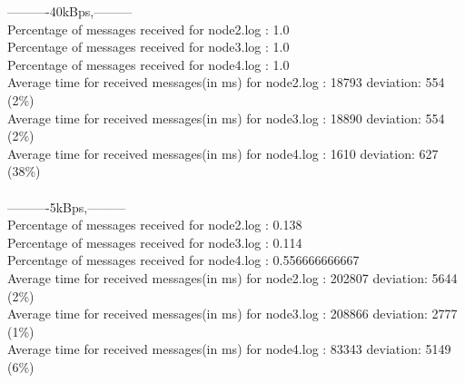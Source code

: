         ----------40kBps,---------\\
        Percentage of messages received for node2.log : 1.0\\
        Percentage of messages received for node3.log : 1.0\\
        Percentage of messages received for node4.log : 1.0\\
        Average time for received messages(in ms) for  node2.log : 18793    deviation: 554 (2\%)\\
        Average time for received messages(in ms) for  node3.log : 18890    deviation: 554 (2\%)\\
        Average time for received messages(in ms) for  node4.log : 1610     deviation: 627 (38\%)\\\\
        ----------5kBps,---------\\
        Percentage of messages received for node2.log : 0.138\\
        Percentage of messages received for node3.log : 0.114\\
        Percentage of messages received for node4.log : 0.556666666667\\
        Average time for received messages(in ms) for  node2.log : 202807   deviation: 5644 (2\%)\\
        Average time for received messages(in ms) for  node3.log : 208866   deviation: 2777 (1\%)\\
        Average time for received messages(in ms) for  node4.log : 83343    deviation: 5149 (6\%)\\
